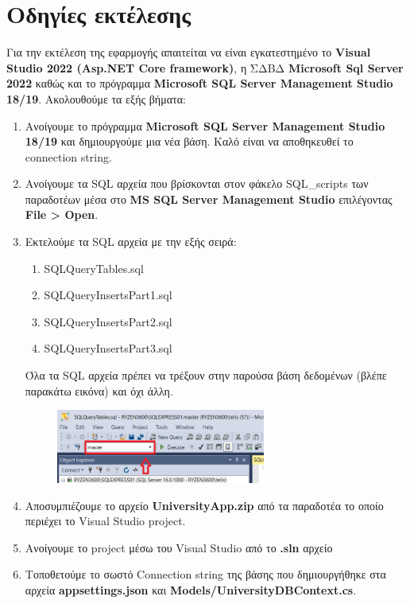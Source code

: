 \documentclass[12pt]{article}
\begin{document}
\section{Οδηγίες εκτέλεσης}
Για την εκτέλεση της εφαρμογής απαιτείται να είναι εγκατεστημένο το \textbf{Visual Studio 2022 (Asp.NET Core framework)}, η ΣΔΒΔ \textbf{Microsoft Sql Server 2022} καθώς και το πρόγραμμα \textbf{Microsoft SQL Server Management Studio 18/19}. Ακολουθούμε τα εξής βήματα:

\begin{enumerate}
	\item Ανοίγουμε το πρόγραμμα \textbf{Microsoft SQL Server Management Studio 18/19} και δημιουργούμε μια νέα βάση. Καλό είναι να αποθηκευθεί το connection string.
	
	\item Ανοίγουμε τα SQL αρχεία που βρίσκονται στον φάκελο SQL\_scripts των παραδοτέων μέσα στο \textbf{MS SQL Server Management Studio} επιλέγοντας \textbf{File > Open}.
	
	\item Εκτελούμε τα SQL αρχεία με την εξής σειρά: 
	\begin{enumerate}
		\item SQLQueryTables.sql
		\item SQLQueryInsertsPart1.sql
		\item SQLQueryInsertsPart2.sql
		\item SQLQueryInsertsPart3.sql
	\end{enumerate}

	Όλα τα SQL αρχεία πρέπει να τρέξουν στην παρούσα βάση δεδομένων (βλέπε παρακάτω εικόνα) και όχι άλλη.
	
	\begin{figure}[H]
		\centering
		\includegraphics[width=0.65\textwidth]{sqls.png}
		\caption{}
	\end{figure}
	
	\item Αποσυμπιέζουμε το αρχείο \textbf{UniversityApp.zip} από τα παραδοτέα το οποίο περιέχει το Visual Studio project.
	
	\item Ανοίγουμε το project μέσω του Visual Studio από το \textbf{.sln} αρχείο
	
	\item Τοποθετούμε το σωστό Connection string της βάσης που δημιουργήθηκε στα αρχεία \textbf{appsettings.json} και \textbf{Models/UniversityDBContext.cs}.
	
\end{enumerate}
\end{document}
